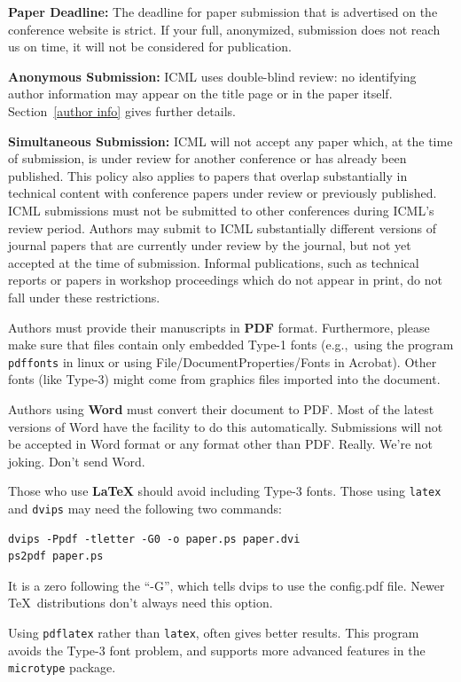 \documentclass{article}
\begin{document}
\textbf{Paper Deadline:} The deadline for paper submission that is
advertised on the conference website is strict. If your full,
anonymized, submission does not reach us on time, it will not be
considered for publication. 

\textbf{Anonymous Submission:} ICML uses double-blind review: no identifying
author information may appear on the title page or in the paper
itself. Section~\ref{author info} gives further details.

\textbf{Simultaneous Submission:} ICML will not accept any paper which,
at the time of submission, is under review for another conference or
has already been published. This policy also applies to papers that
overlap substantially in technical content with conference papers
under review or previously published. ICML submissions must not be
submitted to other conferences during ICML's review period. Authors
may submit to ICML substantially different versions of journal papers
that are currently under review by the journal, but not yet accepted
at the time of submission. Informal publications, such as technical
reports or papers in workshop proceedings which do not appear in
print, do not fall under these restrictions.

\medskip

Authors must provide their manuscripts in \textbf{PDF} format.
Furthermore, please make sure that files contain only embedded Type-1 fonts
(e.g.,~using the program \texttt{pdffonts} in linux or using
File/DocumentProperties/Fonts in Acrobat). Other fonts (like Type-3)
might come from graphics files imported into the document.

Authors using \textbf{Word} must convert their document to PDF\@. Most
of the latest versions of Word have the facility to do this
automatically. Submissions will not be accepted in Word format or any
format other than PDF\@. Really. We're not joking. Don't send Word.

Those who use \textbf{\LaTeX} should avoid including Type-3 fonts.
Those using \texttt{latex} and \texttt{dvips} may need the following
two commands:

{\footnotesize
\begin{verbatim}
dvips -Ppdf -tletter -G0 -o paper.ps paper.dvi
ps2pdf paper.ps
\end{verbatim}}
It is a zero following the ``-G'', which tells dvips to use
the config.pdf file. Newer \TeX\ distributions don't always need this
option.

Using \texttt{pdflatex} rather than \texttt{latex}, often gives better
results. This program avoids the Type-3 font problem, and supports more
advanced features in the \texttt{microtype} package.
\end{document}
